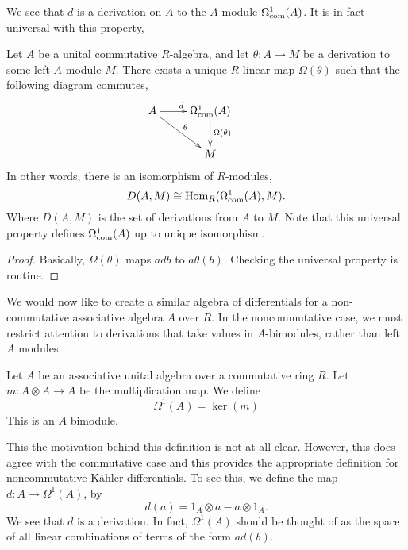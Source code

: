 \documentclass{owmaths}
\begin{document}
We see that $d$ is a derivation on $A$ to the $A$-module $\Omega^1_{\mathrm{com}}(A)$.
It is in fact universal with this property,
\begin{theorem}
    Let $A$ be a unital commutative $R$-algebra, and let $\theta:A\rightarrow M$
    be a derivation to some left $A$-module $M$. There exists a unique $R$-linear 
    map $\Omega(\theta)$ such that the following diagram commutes,\\
    \begin{displaymath}
    \xymatrix{
        A \ar[r]^d \ar[rd]^\theta & 
        \Omega^1_{\com}(A) \ar@{.>}[d]^{\Omega(\theta)} &\\
         &
        M
  } 
  \end{displaymath}
  In other words, there is an isomorphism of $R$-modules,
  \begin{equation*}
    D(A,M) \cong \operatorname{Hom}_R(\Omega^1_{\mathrm{com}}(A),M).
  \end{equation*}
  Where $D(A,M)$ is the set of derivations from $A$ to $M$.
  Note that this universal property defines $\Omega^1_{\mathrm{com}}(A)$ up
  to unique isomorphism.
\end{theorem}
\begin{proof}
    Basically, $\Omega(\theta)$ maps $adb$ to $a\theta(b)$. Checking the universal property
    is routine.
\end{proof}

We would now like to create a similar algebra of differentials for a non-commutative
associative algebra $A$ over $R$. In the noncommutative case, we must restrict
attention to derivations that take values in $A$-bimodules, rather than left
$A$ modules.
\begin{definition}
    Let $A$ be an associative
    unital algebra over a commutative ring $R$. 
    Let $m:A\otimes A\rightarrow A$ be the multiplication map. We define
    \begin{equation*}
        \Omega^1(A) = \ker(m)
    \end{equation*}
    This is an $A$ bimodule.
\end{definition}
This the motivation behind this definition is not at all clear. However, this
does agree with the commutative case and this provides the appropriate definition
for noncommutative K\"ahler differentials. To see this, we define the map
$d:A\rightarrow \Omega^1(A)$, by
\begin{equation*}
    d(a) = 1_A\otimes a-a\otimes 1_A.
\end{equation*}
We see that $d$ is a derivation. In fact, $\Omega^1(A)$
should be thought of as the space of all linear combinations
of terms of the form $ad(b)$.
\end{document}

